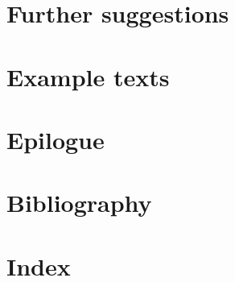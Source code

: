 \documentclass[twoside, openany, 12pt, a5paper]{book}
\begin{document}
\chapter{Further suggestions}

\chapter{Example texts}

\backmatter

\chapter{Epilogue}

\chapter{Bibliography}

\chapter{Index}


\end{document}
